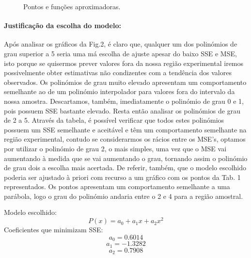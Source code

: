 \documentclass[a4paper,10pt]{extarticle}
\begin{document}
\begin{figure}[htb]
\centerline{ }
\caption{Pontos e funções aproximadoras.}
\label{fig:figurapergunta2}
\end{figure}

\paragraph{Justificação da escolha do modelo:}


Após analisar os gráficos da Fig.2, é claro que, qualquer um dos polinómios de grau superior a 5 seria uma má escolha de ajuste apesar do baixo SSE e MSE, isto porque se quisermos prever valores fora da nossa região experimental iremos possivelmente obter estimativas não condizentes com a tendência dos valores observados. Os polinómios de grau muito elevado apresentam um comportamento semelhante ao de um polinómio interpolador para valores fora do intervalo da nossa amostra. Descartamos, também, imediatamente o polinómio de grau 0 e 1, pois possuem SSE bastante elevado.
Resta então analisar os polinómios de grau de 2 a 5. Através da tabela, é possível verificar que todos estes polinómios possuem um SSE semelhante e aceitável e têm um comportamento semelhante na região experimental, contudo se considerarmos os rácios entre os MSE’s, optamos por utilizar o polinómio de grau 2, o mais simples, uma vez que o MSE vai aumentando à medida que se vai aumentando o grau, tornando assim o polinómio de grau dois a escolha mais acertada.
De referir, também, que o modelo escolhido poderia ser ajustado à priori com recurso a um gráfico com os pontos da Tab. 1 representados. Os pontos apresentam um comportamento semelhante a uma parábola, logo o grau do polinómio andaria entre o 2 e 4 para a região amostral.




Modelo escolhido:
\[ P(x)=a_0+a_1x+a_2x^2
\]
Coeficientes que minimizam SSE:
\[a_0=0.6014
\]
\[a_1=-1.3282
\]
\[a_2=0.7908
\]
\end{document}
